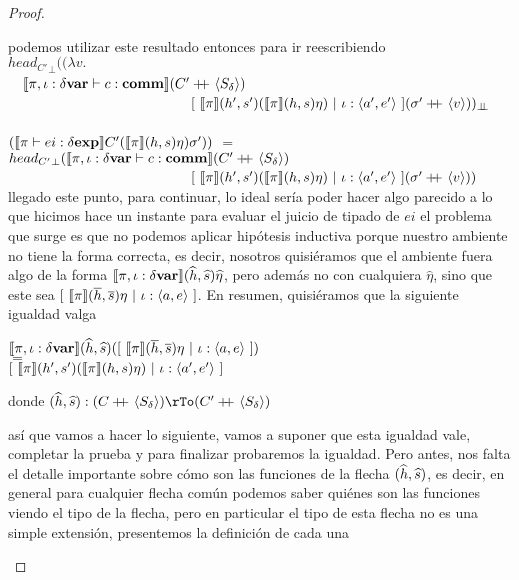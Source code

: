 \begin{proof}
\begin{itemize}
\begin{itemize}
podemos utilizar este resultado entonces para ir reescribiendo\\

${head_{C'}}_{\bot} ((\lambda v .$ \\
\indent \ \ 
	$\llbracket \pi,\iota:\delta \textbf{var} \vdash c : \textbf{comm} \rrbracket(C' +\kern-1.3ex+\kern0.8ex \langle S_\delta \rangle)$\\
\indent \ \ \ \ \ \ \ \ \ \ \ \ \ \ \ \ \ \ \ \ \ \ \ \ \ \
			$[ \ \semBrcks{\pi}(h',s')(\semBrcks{\pi}(h,s)\eta) \ | \ \iota:\lrangles{a',e'} \ ]
			(\sigma' \concat \lrangles{v}))_{\dbot}$\\
\indent \ \ \ \ \ \ \ \ \ \ \ \ \ \ \ \ \ \ \ \ \ \ \ \ \ \ \ \ \ \ \ \ \ \ \ \ \ \ \ \ \ \ \ \ \
 \ \ \ \ \ \ \ \ \ \ \ \ 
	$(\llbracket \pi \vdash ei : \delta \textbf{exp} \rrbracket C'(\llbracket \pi \rrbracket(h,s)\eta)\sigma'))$ $=$\\
${head_{C'}}_{\bot} 
	(\llbracket \pi,\iota:\delta \textbf{var} \vdash c : \textbf{comm} \rrbracket(C' +\kern-1.3ex+\kern0.8ex \langle S_\delta \rangle)$\\
\indent \ \ \ \ \ \ \ \ \ \ \ \ \ \ \ \ \ \ \ \ \ \ \ \ \ \
			$[ \ \semBrcks{\pi}(h',s')(\semBrcks{\pi}(h,s)\eta) \ | \ \iota:\lrangles{a',e'} \ ]
			(\sigma' \concat \lrangles{v}))$\\
			
llegado este punto, para continuar, lo ideal ser\'ia poder hacer algo parecido
a lo que hicimos hace un instante para evaluar el juicio de tipado de $ei$ el problema
que surge es que no podemos aplicar hip\'otesis inductiva porque nuestro ambiente
no tiene la forma correcta, es decir, nosotros quisi\'eramos que el ambiente
fuera algo de la forma $\llbracket \pi,\iota:\delta \textbf{var} \rrbracket(\widehat{h},\widehat{s})\widehat{\eta}$, pero
adem\'as no con cualquiera $\widehat{\eta}$, sino que este sea
$[ \ \semBrcks{\pi}(\hover,\sover)\eta \ | \ \iota:\lrangles{a,e} \ ]$. 
En resumen, quisi\'eramos que la siguiente igualdad valga

\begin{center}
$\semBrcks{\pi,\iota:\deltavar}(\hhat,\shat)
([ \ \semBrcks{\pi}(\hover,\sover)\eta \ | \ \iota:\lrangles{a,e} \ ])$\\ 
$=$\\
$[ \ \semBrcks{\pi}(h',s')(\semBrcks{\pi}(h,s)\eta) \ | \ \iota:\lrangles{a',e'} \ ]$
\end{center}

donde
$(\hhat,\shat) : (C\concat\lrangles{S_\delta}) \rTo (C'\concat\lrangles{S_\delta})$ 

as\'i que vamos a hacer lo siguiente, vamos a suponer que esta igualdad vale, completar la prueba
y para finalizar probaremos la igualdad. Pero antes, nos falta el detalle importante sobre
c\'omo son las funciones de la flecha $(\widehat{h},\widehat{s})$, es decir, en general para cualquier
flecha com\'un podemos saber qui\'enes son las funciones viendo el tipo de la flecha, pero
en particular el tipo de esta flecha no es una simple extensi\'on, presentemos la definici\'on
de cada una\\


\end{itemize}
\end{itemize}
\end{proof}
